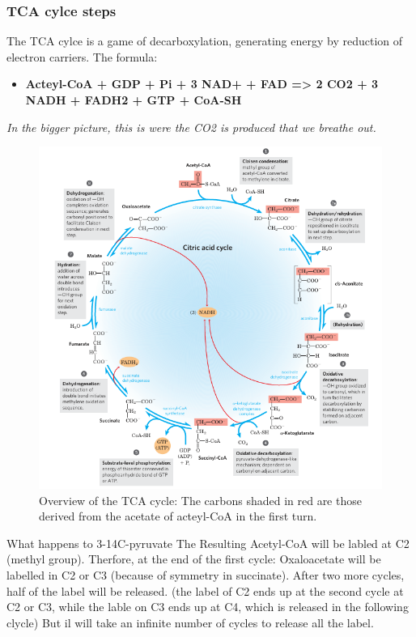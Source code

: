 \documentclass[../main.tex]{subfiles}
\begin{document}
\subsubsection{TCA cylce steps}
The TCA cylce is a game of decarboxylation, generating energy by reduction of electron carriers. The formula: 
\begin{itemize}
	\item \textbf{Acteyl-CoA + GDP + Pi + 3 NAD+ + FAD => 2 CO2 + 3 NADH + FADH2 + GTP + CoA-SH}
\end{itemize}
\noindent \textit{In the bigger picture, this is were the CO2 is produced that we breathe out.}
\begin{figure}[H]
	\centering
	\includegraphics[width = \textwidth]{TCA1}
	\caption{Overview of the TCA cycle: The carbons shaded in red are those derived from the acetate of acteyl-CoA in the first turn.}
\end{figure}

\begin{RemarkWithTitel}{What happens to 3-14C-pyruvate}
	 The Resulting Acetyl-CoA will be labled at C2 (methyl group). Therfore, at the end of the first cycle: Oxaloacetate will be labelled in C2 or C3 (because of symmetry in succinate). After two more cycles, half of the label will be released. (the label of C2 ends up at the second cycle at C2 or C3, while the lable on C3 ends up at C4, which is released in the following clycle) But il will take an infinite number of cycles to release all the label. 
\end{RemarkWithTitel}
\end{document}
